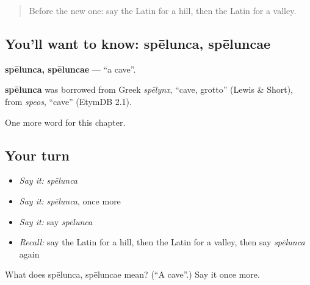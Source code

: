 \label{lesson:LA-C88-spelunca}



\begin{quote}
Before the new one: say the Latin for a hill, then the Latin for a valley.
\end{quote}

\subsection*{You'll want to know: spēlunca, spēluncae}
\textbf{spēlunca, spēluncae} — \textquotedblleft{}a cave\textquotedblright{}.

\begin{cousinweb}
\textbf{spēlunca} was borrowed from Greek \emph{spēlynx}, \textquotedblleft{}cave, grotto\textquotedblright{} (Lewis \& Short), from \emph{speos}, \textquotedblleft{}cave\textquotedblright{} (EtymDB 2.1).
\end{cousinweb}

\begin{grammarlens}[title={What you've built}]
One more word for this chapter.
\end{grammarlens}

\subsection*{Your turn}
\begin{itemize}
\raggedright
  \item \emph{Say it:} \emph{spēlunca}
  \item \emph{Say it:} \emph{spēlunca}, once more
  \item \emph{Say it:} say \emph{spēlunca}
  \item \emph{Recall:} say the Latin for a hill, then the Latin for a valley, then say \emph{spēlunca} again
\end{itemize}

\begin{tcolorbox}[breakable,colback=teal!4,colframe=teal!35!black,title={Before you move on}]
What does spēlunca, spēluncae mean? (\textquotedblleft{}A cave\textquotedblright{}.) Say it once more.
\end{tcolorbox}
